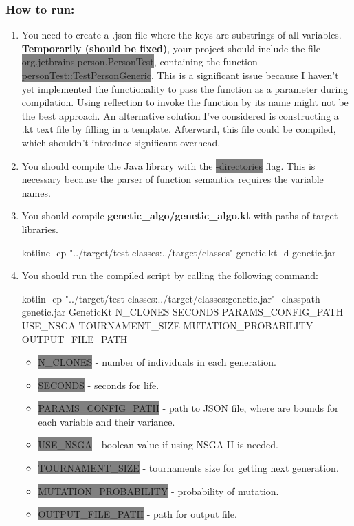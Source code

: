 \documentclass[12pt,letterpaper]{article}
\begin{document}
\subsubsection*{How to run:}
\begin{enumerate}
\item You need to create a .json file where the keys are substrings of all variables. \textbf{Temporarily (should be fixed)}, your project should include the file \colorbox{gray}{org.jetbrains.person.PersonTest}, containing the function \colorbox{gray}{personTest::TestPersonGeneric}. This is a significant issue because I haven't yet implemented the functionality to pass the function as a parameter during compilation. Using reflection to invoke the function by its name might not be the best approach. An alternative solution I've considered is constructing a .kt text file by filling in a template. Afterward, this file could be compiled, which shouldn't introduce significant overhead.
\item You should compile the Java library with the \colorbox{gray}{-directories} flag. This is necessary because the parser of function semantics requires the variable names.
\item You should compile \textbf{genetic\_algo/genetic\_algo.kt} with paths of target libraries.
    \begin{python}
    kotlinc -cp "../target/test-classes:../target/classes" genetic.kt -d genetic.jar  
    \end{python}
\item You should run the compiled script by calling the following command:
    \begin{python}
 kotlin -cp "../target/test-classes:../target/classes:genetic.jar" -classpath genetic.jar GeneticKt N_CLONES SECONDS PARAMS_CONFIG_PATH USE_NSGA TOURNAMENT_SIZE MUTATION_PROBABILITY OUTPUT_FILE_PATH    \end{python}
\begin{itemize}
\item \colorbox{gray}{N\_CLONES} - number of individuals in each generation.
\item \colorbox{gray}{SECONDS} - seconds for life.
\item \colorbox{gray}{PARAMS\_CONFIG\_PATH} - path to JSON file, where are bounds for each variable and their variance.
\item \colorbox{gray}{USE\_NSGA} - boolean value if using NSGA-II is needed.
\item \colorbox{gray}{TOURNAMENT\_SIZE} - tournaments size for getting next generation.
\item \colorbox{gray}{MUTATION\_PROBABILITY} - probability of mutation.
\item \colorbox{gray}{OUTPUT\_FILE\_PATH} - path for output file.
\end{itemize}
\end{enumerate}
\end{document}
